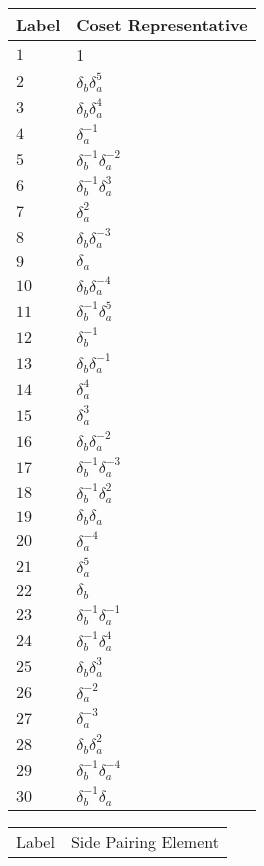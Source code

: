 \documentclass{article}
\begin{document}

\begin{center}
\begin{tabular}{ll}
\toprule
Label & Coset Representative\\
\midrule
$1$ & 1 \\
$2$ & $\delta_b^{}\delta_a^{5}$ \\
$3$ & $\delta_b^{}\delta_a^{4}$ \\
$4$ & $\delta_a^{-1}$ \\
$5$ & $\delta_b^{-1}\delta_a^{-2}$ \\
$6$ & $\delta_b^{-1}\delta_a^{3}$ \\
$7$ & $\delta_a^{2}$ \\
$8$ & $\delta_b^{}\delta_a^{-3}$ \\
$9$ & $\delta_a^{}$ \\
$10$ & $\delta_b^{}\delta_a^{-4}$ \\
$11$ & $\delta_b^{-1}\delta_a^{5}$ \\
$12$ & $\delta_b^{-1}$ \\
$13$ & $\delta_b^{}\delta_a^{-1}$ \\
$14$ & $\delta_a^{4}$ \\
$15$ & $\delta_a^{3}$ \\
$16$ & $\delta_b^{}\delta_a^{-2}$ \\
$17$ & $\delta_b^{-1}\delta_a^{-3}$ \\
$18$ & $\delta_b^{-1}\delta_a^{2}$ \\
$19$ & $\delta_b^{}\delta_a^{}$ \\
$20$ & $\delta_a^{-4}$ \\
$21$ & $\delta_a^{5}$ \\
$22$ & $\delta_b^{}$ \\
$23$ & $\delta_b^{-1}\delta_a^{-1}$ \\
$24$ & $\delta_b^{-1}\delta_a^{4}$ \\
$25$ & $\delta_b^{}\delta_a^{3}$ \\
$26$ & $\delta_a^{-2}$ \\
$27$ & $\delta_a^{-3}$ \\
$28$ & $\delta_b^{}\delta_a^{2}$ \\
$29$ & $\delta_b^{-1}\delta_a^{-4}$ \\
$30$ & $\delta_b^{-1}\delta_a^{}$ \\
\bottomrule
\end{tabular}
\hfill
\begin{tabular}{ll}
\toprule
Label & Side Pairing Element\\

\end{tabular}
\end{center}
\end{document}
